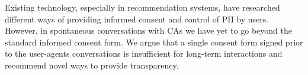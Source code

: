 \documentclass[sigchi-a,nonacm]{acmart}
\begin{document}



Existing technology, especially in recommendation systems, have researched different ways of providing informed consent and control of PII by users. However, in spontaneous conversations with CAs we have yet to go beyond the standard informed consent form. We argue that a single consent form signed prior to the user-agents conversations is insufficient for long-term interactions and recommend novel ways to provide transparency.


\end{document}
